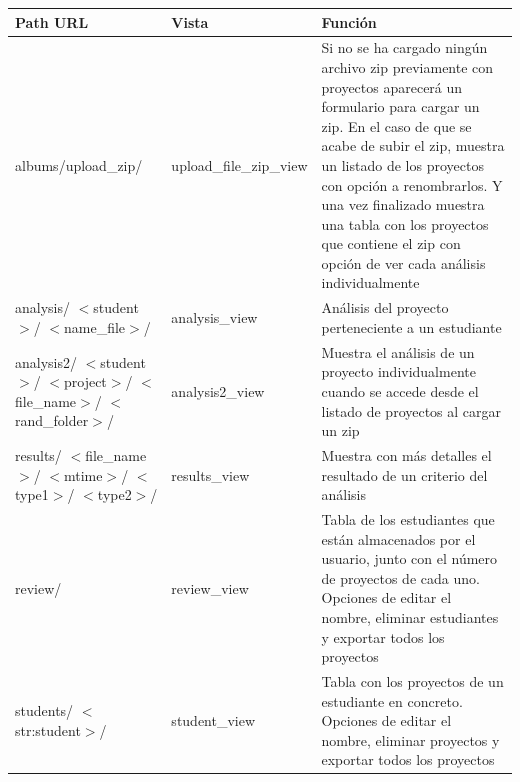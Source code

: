 \documentclass[a4paper, 12pt]{book}
\begin{document}
    \begin{table}[H]
     \begin{center}
      \begin{tabular}{ | m{3.1cm} | m{3.3cm} | m{8.8cm} | }
        \hline \textbf{Path URL} & \textbf{Vista} & \textbf{Función}\\ \hline
    
        albums/upload\_zip/ &
        upload\_file\_zip\_view &
        Si no se ha cargado ningún archivo zip previamente con proyectos aparecerá un formulario para cargar un zip.
        En el caso de que se acabe de subir el zip, muestra un listado de los proyectos con opción a renombrarlos.
        Y una vez finalizado muestra una tabla con los proyectos que contiene el zip con opción de ver cada análisis individualmente \\ \hline 
        
        analysis/ \newline $<$student$>$/ \newline $<$name\_file$>$/ &
        analysis\_view &
        Análisis del proyecto perteneciente a un estudiante \\ \hline
        
        analysis2/ \newline $<$student$>$/ \newline $<$project$>$/ \newline $<$file\_name$>$/ \newline $<$rand\_folder$>$/ &
        analysis2\_view &
        Muestra el análisis de un proyecto individualmente cuando se accede desde el listado de proyectos al cargar un zip \\ \hline 
        
        results/ \newline $<$file\_name$>$/ \newline $<$mtime$>$/ \newline $<$type1$>$/ \newline $<$type2$>$/ &
        results\_view &
        Muestra con más detalles el resultado de un criterio del análisis \\ \hline 
        
        review/ &
        review\_view &
        Tabla de los estudiantes que están almacenados por el usuario, junto con el número de proyectos de cada uno. Opciones de editar el nombre, eliminar estudiantes y exportar todos los proyectos \\ \hline
        
        students/ \newline $<$str:student$>$/ &
        student\_view &
        Tabla con los proyectos de un estudiante en concreto. 
        Opciones de editar el nombre, eliminar proyectos y exportar todos los proyectos \\ \hline
        

\end{tabular}
\end{center}
\end{table}
\end{document}
